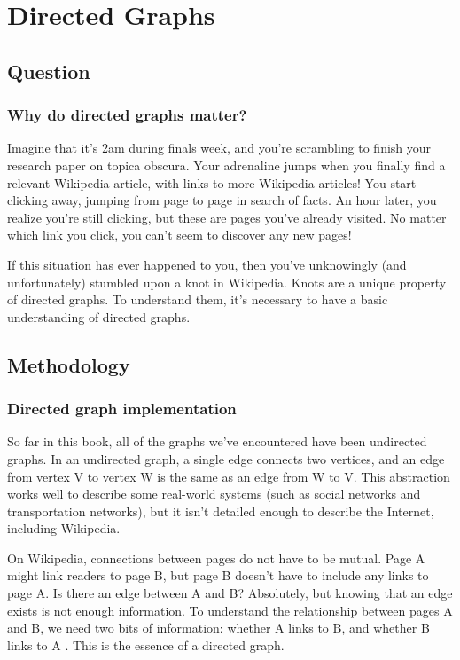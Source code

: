\documentclass[10pt]{book}
\begin{document}
\chapter {Directed Graphs}
\section{Question}
\subsection{Why do directed graphs matter?}
Imagine that it’s 2am during finals week, and you’re scrambling to finish your research paper on topica obscura. Your adrenaline jumps when you finally find a relevant Wikipedia article, with links to more Wikipedia articles! You start clicking away, jumping from page to page in search of facts. An hour later, you realize you’re still clicking, but these are pages you’ve already visited. No matter which link you click, you can’t seem to discover any new pages! 

If this situation has ever happened to you, then you’ve unknowingly (and unfortunately) stumbled upon a knot in Wikipedia. Knots are a unique property of directed graphs. To understand them, it’s necessary to have a basic understanding of directed graphs.
\section{Methodology}
\subsection{Directed graph implementation}
	 	 	
So far in this book, all of the graphs we’ve encountered have been undirected graphs. In an undirected graph, a single edge connects two vertices, and an edge from vertex V to vertex W is the same as an edge from W to V. This abstraction works well to describe some real-world systems (such as social networks and transportation networks), but it isn’t detailed enough to describe the Internet, including Wikipedia. 

On Wikipedia, connections between pages do not have to be mutual. Page A might link readers to page B, but page B doesn’t have to include any links to page A. Is there an edge between A and B? Absolutely, but knowing that an edge exists is not enough information. To understand the relationship between pages A and B, we need two bits of information: whether A links to B, and whether B links to A . This is the essence of a directed graph.
\end{document}
